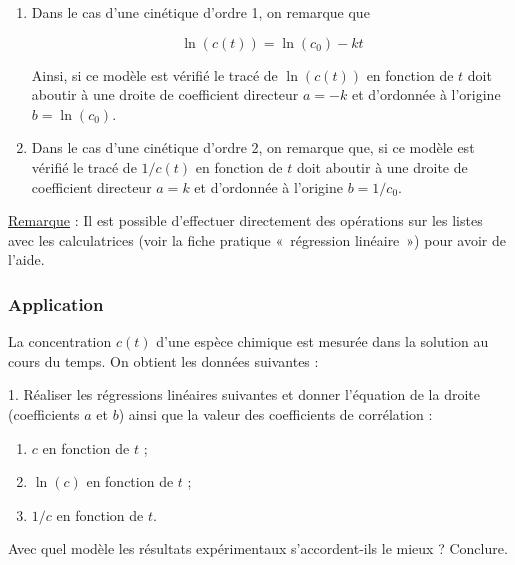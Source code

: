 \documentclass[a4paper, 12pt, final, garamond]{book}
\begin{document}
\begin{enumerate}
\item Dans le cas d'une cinétique d'ordre 1, on remarque que

\[\ln(c(t)) = \ln(c_0)-kt\]

Ainsi, si ce modèle est vérifié le tracé de $\ln(c(t))$ en fonction
de $t$ doit aboutir à une droite de coefficient directeur $a=-k$ et
d'ordonnée à l'origine $b = \ln(c_0)$.
 
 \item Dans le cas d'une cinétique d'ordre 2, on remarque que, si ce modèle
     est vérifié le tracé de $1/c(t)$ en fonction de $t$ doit aboutir
     à une droite de coefficient directeur $a=k$ et d'ordonnée à
     l'origine $b = 1/c_0$.
\end{enumerate}

\underline{Remarque} : Il est possible d'effectuer directement des opérations
sur les listes avec les calculatrices (voir la fiche pratique «~régression
linéaire~») pour avoir de l'aide. 

\subsubsection{Application}
La concentration $c(t)$ d'une espèce chimique est mesurée dans la solution au
cours du temps. On obtient les données suivantes : 

 
1. Réaliser les régressions linéaires suivantes et donner l'équation de la
droite (coefficients $a$ et $b$) ainsi que la valeur des coefficients de
corrélation : 

\begin{enumerate}
\item $c$ en fonction de $t$ ;
\item $\ln(c)$ en fonction de $t$ ;
\item $1/c$ en fonction de $t$.
\end{enumerate}

Avec quel modèle les résultats expérimentaux s'accordent-ils le mieux ? Conclure.

\vfill
\end{document}
